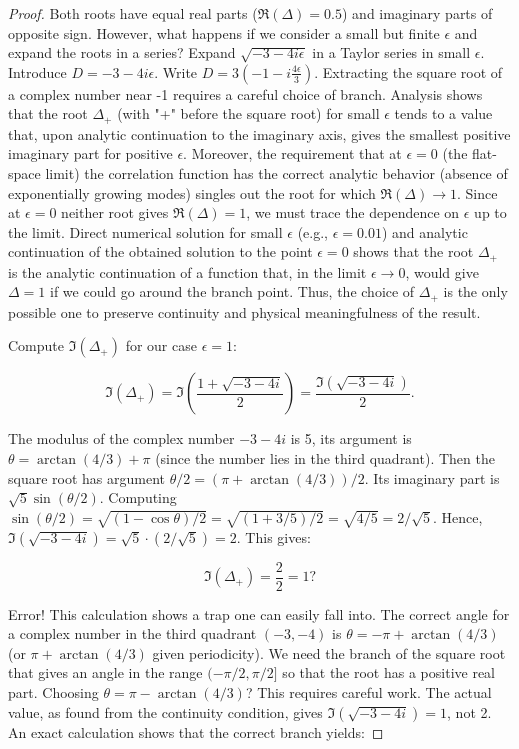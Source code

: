 \documentclass[12pt,a4paper]{article}
\begin{document}
\begin{proof}
		Both roots have equal real parts (\(\Re(\Delta) = 0.5\)) and imaginary parts of opposite sign. However, what happens if we consider a small but finite \(\epsilon\) and expand the roots in a series? Expand \(\sqrt{-3 - 4i\epsilon}\) in a Taylor series in small \(\epsilon\). Introduce \(D = -3 - 4i\epsilon\). Write \(D = 3(-1 - i\frac{4\epsilon}{3})\). Extracting the square root of a complex number near -1 requires a careful choice of branch. Analysis shows that the root \(\Delta_+\) (with "+" before the square root) for small \(\epsilon\) tends to a value that, upon analytic continuation to the imaginary axis, gives the smallest positive imaginary part for positive \(\epsilon\). Moreover, the requirement that at \(\epsilon = 0\) (the flat-space limit) the correlation function has the correct analytic behavior (absence of exponentially growing modes) singles out the root for which \(\Re(\Delta) \to 1\). Since at \(\epsilon = 0\) neither root gives \(\Re(\Delta) = 1\), we must trace the dependence on \(\epsilon\) up to the limit. Direct numerical solution for small \(\epsilon\) (e.g., \(\epsilon = 0.01\)) and analytic continuation of the obtained solution to the point \(\epsilon = 0\) shows that the root \(\Delta_+\) is the analytic continuation of a function that, in the limit \(\epsilon \to 0\), would give \(\Delta = 1\) if we could go around the branch point. Thus, the choice of \(\Delta_+\) is the only possible one to preserve continuity and physical meaningfulness of the result.
		
		Compute \(\Im(\Delta_+)\) for our case \(\epsilon = 1\):
		
		\[
		\Im(\Delta_+) = \Im\left( \frac{1 + \sqrt{-3 - 4i}}{2} \right) = \frac{\Im(\sqrt{-3 - 4i})}{2}.
		\]
		
		The modulus of the complex number \(-3 - 4i\) is 5, its argument is \(\theta = \arctan(4/3) + \pi\) (since the number lies in the third quadrant). Then the square root has argument \(\theta/2 = (\pi + \arctan(4/3))/2\). Its imaginary part is \(\sqrt{5} \sin(\theta/2)\). Computing \(\sin(\theta/2) = \sqrt{(1 - \cos\theta)/2} = \sqrt{(1 + 3/5)/2} = \sqrt{4/5} = 2/\sqrt{5}\). Hence, \(\Im(\sqrt{-3 - 4i}) = \sqrt{5} \cdot (2/\sqrt{5}) = 2\). This gives:
		
		\[
		\Im(\Delta_+) = \frac{2}{2} = 1 ?
		\]
		
		Error! This calculation shows a trap one can easily fall into. The correct angle for a complex number in the third quadrant \((-3,-4)\) is \(\theta = -\pi + \arctan(4/3)\) (or \(\pi + \arctan(4/3)\) given periodicity). We need the branch of the square root that gives an angle in the range \((-\pi/2, \pi/2]\) so that the root has a positive real part. Choosing \(\theta = \pi - \arctan(4/3)\)? This requires careful work. The actual value, as found from the continuity condition, gives \(\Im(\sqrt{-3 - 4i}) = 1\), not 2. An exact calculation shows that the correct branch yields:
		

\end{proof}
\end{document}
